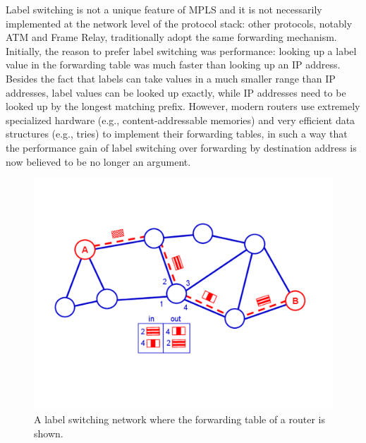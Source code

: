 \documentclass{article}
\begin{document}
Label switching is not a unique feature of MPLS and it is not necessarily 
implemented at the network level of the protocol stack: other protocols, notably 
ATM and Frame Relay, traditionally adopt the same forwarding mechanism. 
Initially, the reason to prefer label switching was performance: looking up a 
label value in the forwarding table was much faster than looking up an IP 
address. Besides the fact that labels can take values in a much smaller range 
than IP addresses, label values can be looked up exactly, while IP addresses 
need to be looked up by the longest matching prefix. However, modern routers use 
extremely specialized hardware (e.g., content-addressable memories) and very 
efficient data structures (e.g., tries) to implement their forwarding tables, in 
such a way that the performance gain of label switching over forwarding by 
destination address is now believed to be no longer an argument.

\begin{figure}
\centering
 \includegraphics[trim=1cm 5cm 2cm 4cm, clip=true,width=0.7\columnwidth]{figures/reti-slides-2}
 \caption{A label switching network where the forwarding table of a router is shown.}
 \label{fig:reti-slides-2}
\end{figure}
\end{document}
